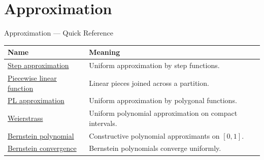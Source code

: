 
\section{Approximation}

\begin{toolkitbox}{Approximation --- Quick Reference}
\small
\begin{tabular}{l l}
\toprule
\textbf{Name} & \textbf{Meaning}\\
\midrule
\hyperref[thm:step-function-approximation]{Step approximation} & Uniform approximation by step functions.\\
\hyperref[def:piecewise-linear-function]{Piecewise linear function} & Linear pieces joined across a partition.\\
\hyperref[thm:piecewise-linear-approximation]{PL approximation} & Uniform approximation by polygonal functions.\\
\hyperref[thm:weierstrass-approximation]{Weierstrass} & Uniform polynomial approximation on compact intervals.\\
\hyperref[def:bernstein-polynomial]{Bernstein polynomial} & Constructive polynomial approximants on $[0,1]$.\\
\hyperref[thm:bernstein-approximation]{Bernstein convergence} & Bernstein polynomials converge uniformly.\\
\bottomrule
\end{tabular}
\end{toolkitbox}



